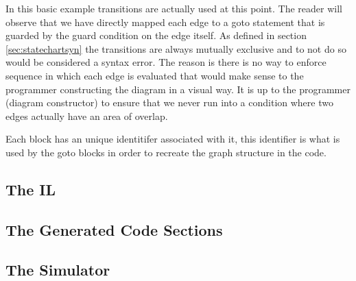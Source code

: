 In this basic example transitions are actually used at this point. The reader will observe that we have directly mapped each edge to a goto statement that is guarded by the guard condition on the edge itself. As defined in section \ref{sec:statechartsyn} the transitions are always mutually exclusive and to not do so would be considered a syntax error. The reason is there is no way to enforce sequence in which each edge is evaluated that would make sense to the programmer constructing the diagram in a visual way. It is up to the programmer (diagram constructor) to ensure that we never run into a condition where two edges actually have an area of overlap.

Each block has an unique identitifer associated with it, this identifier is what is used by the goto blocks in order to recreate the graph structure in the code.


\subsection{The IL}
\subsection{The Generated Code Sections}
\subsection{The Simulator}